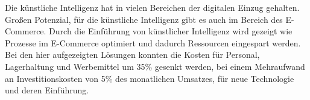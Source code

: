Die künstliche Intelligenz hat in vielen Bereichen der digitalen Einzug gehalten. Großen Potenzial, für die künstliche Intelligenz gibt es auch im Bereich des E-Commerce. Durch die Einführung von künstlicher Intelligenz wird gezeigt wie Prozesse im E-Commerce optimiert und dadurch Ressourcen eingespart werden. Bei den hier aufgezeigten Lösungen konnten die Kosten für Personal, Lagerhaltung und Werbemittel um 35\% gesenkt werden, bei einem Mehraufwand an Investitionskosten von 5\% des monatlichen Umsatzes, für neue Technologie und deren Einführung.